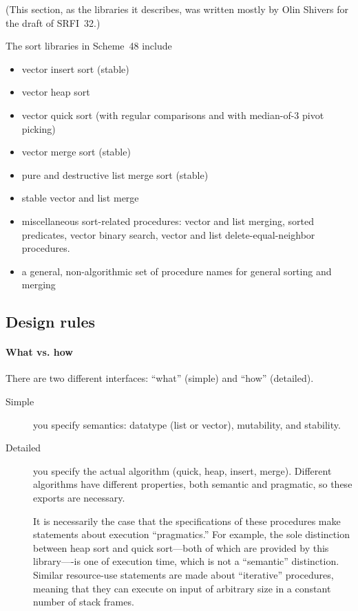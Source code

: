 (This section, as the libraries it describes, was written mostly by
Olin Shivers for the draft of SRFI~32.)

The sort libraries in Scheme~48 include
%
\begin{itemize}
\item vector insert sort (stable)
\item vector heap sort
\item vector quick sort (with regular comparisons and with median-of-3 pivot picking)
\item vector merge sort (stable)
\item pure and destructive list merge sort (stable)
\item stable vector and list merge
\item miscellaneous sort-related procedures: vector and list merging, 
  sorted predicates, vector binary search, vector and list 
  delete-equal-neighbor procedures.
\item a general, non-algorithmic set of procedure names for general sorting
  and merging
\end{itemize}

\subsection{Design rules}

\paragraph{What vs. how}

There are two different interfaces: ``what'' (simple) and ``how'' (detailed).

\begin{description}
\item[Simple] you specify semantics: datatype (list or vector), 
  mutability, and stability.
  
\item[Detailed] you specify the actual algorithm (quick, heap,
  insert, merge). Different algorithms have different properties,
  both semantic and pragmatic, so these exports are necessary.
  
  It is necessarily the case that the specifications of these procedures
  make statements about execution ``pragmatics.'' For example, the sole
  distinction between heap sort and quick sort---both of which are
  provided by this library----is one of execution time, which is not a
  ``semantic'' distinction. Similar resource-use statements are made about
  ``iterative'' procedures, meaning that they can execute on input of
  arbitrary size in a constant number of stack frames.
\end{description}

